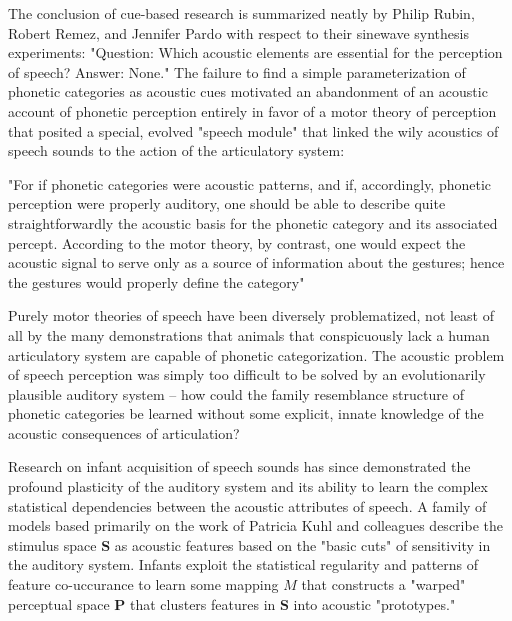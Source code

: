 The conclusion of cue-based research is summarized neatly by Philip Rubin, Robert Remez, and Jennifer Pardo with respect to their sinewave synthesis experiments: "Question: Which acoustic elements are essential for the perception of speech? Answer: None\citep{HaskinsLaboratories2020}." The failure to find a simple parameterization of phonetic categories as acoustic cues motivated an abandonment of an acoustic account of phonetic perception entirely in favor of a motor theory of perception that posited a special, evolved "speech module" that linked the wily acoustics of speech sounds to the action of the articulatory system:

\begin{leftbar}
"For if phonetic categories were acoustic patterns, and if, accordingly, phonetic perception were properly auditory, one should be able to describe quite straightforwardly the acoustic basis for the phonetic category and its associated percept. According to the motor theory, by contrast, one would expect the acoustic signal to serve only as a source of information about the gestures; hence the gestures would properly define the category"
\citep{Liberman1985a}
\end{leftbar}

Purely motor theories of speech have been diversely problematized, not least of all by the many demonstrations that animals that conspicuously lack a human articulatory system are capable of phonetic categorization\citep{Carbonell2014,Lotto1997,Kluender2000}. The acoustic problem of speech perception was simply too difficult to be solved by an evolutionarily plausible auditory system -- how could the family resemblance structure of phonetic categories be learned without some explicit, innate knowledge of the acoustic consequences of articulation?\citep{Bailey1980} 

Research on infant acquisition of speech sounds has since demonstrated the profound plasticity of the auditory system and its ability to learn the complex statistical dependencies between the acoustic attributes of speech\citep{kuhlNewViewLanguage2000}. A family of models based primarily on the work of Patricia Kuhl and colleagues describe the stimulus space $\mathbf{S}$ as acoustic features based on the "basic cuts" of sensitivity in the auditory system\citep{kuhlEarlyLanguageAcquisition2004}. Infants exploit the statistical regularity and patterns of feature co-uccurance to learn some mapping $M$ that constructs a "warped" perceptual space $\mathbf{P}$ that clusters features in $\mathbf{S}$ into acoustic "prototypes."\citep{kuhlNewViewLanguage2000} 

